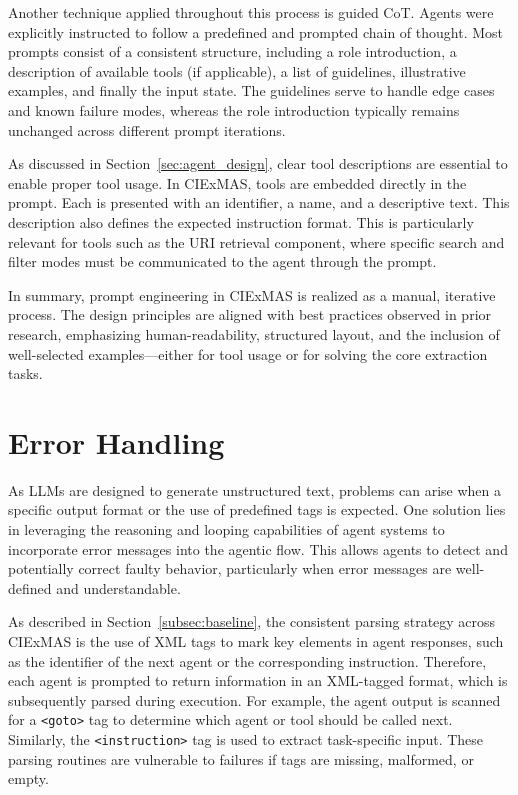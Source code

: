 \documentclass[a4paper,oneside,bibliography=totoc]{scrbook}
\begin{document}
Another technique applied throughout this process is guided \ac{CoT}. Agents were explicitly instructed to follow a predefined and prompted chain of thought. Most prompts consist of a consistent structure, including a role introduction, a description of available tools (if applicable), a list of guidelines, illustrative examples, and finally the input state. The guidelines serve to handle edge cases and known failure modes, whereas the role introduction typically remains unchanged across different prompt iterations.

As discussed in Section~\ref{sec:agent_design}, clear tool descriptions are essential to enable proper tool usage. In CIExMAS, tools are embedded directly in the prompt. Each is presented with an identifier, a name, and a descriptive text. This description also defines the expected instruction format. This is particularly relevant for tools such as the URI retrieval component, where specific search and filter modes must be communicated to the agent through the prompt.

In summary, prompt engineering in CIExMAS is realized as a manual, iterative process. The design principles are aligned with best practices observed in prior research, emphasizing human-readability, structured layout, and the inclusion of well-selected examples—either for tool usage or for solving the core extraction tasks.

\section{Error Handling}
\label{sec:error_incorportion}

As \acp{LLM} are designed to generate unstructured text, problems can arise when a specific output format or the use of predefined tags is expected. One solution lies in leveraging the reasoning and looping capabilities of agent systems to incorporate error messages into the agentic flow. This allows agents to detect and potentially correct faulty behavior, particularly when error messages are well-defined and understandable.

As described in Section~\ref{subsec:baseline}, the consistent parsing strategy across CIExMAS is the use of XML tags to mark key elements in agent responses, such as the identifier of the next agent or the corresponding instruction. Therefore, each agent is prompted to return information in an XML-tagged format, which is subsequently parsed during execution. For example, the agent output is scanned for a \texttt{<goto>} tag to determine which agent or tool should be called next. Similarly, the \texttt{<instruction>} tag is used to extract task-specific input. These parsing routines are vulnerable to failures if tags are missing, malformed, or empty.
\end{document}
